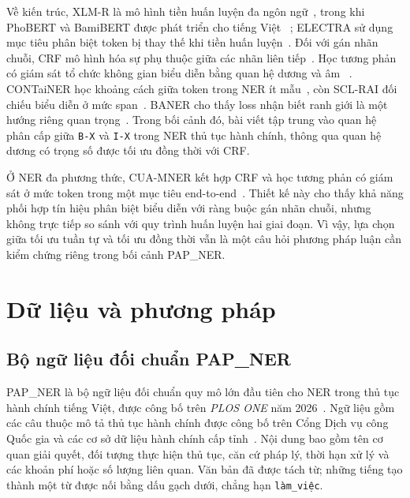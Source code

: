 \documentclass[conference,a4paper]{IEEEtran}
\begin{document}
Về kiến trúc, XLM-R là mô hình tiền huấn luyện đa ngôn ngữ~\cite{conneau2020xlmr},
trong khi PhoBERT và BamiBERT được phát triển cho tiếng Việt
~\cite{nguyen2020phobert,nguyen2026bamibert}; ELECTRA sử dụng mục tiêu phân biệt token bị thay thế khi
tiền huấn luyện~\cite{clark2020electra}. Đối với gán nhãn chuỗi, CRF mô hình hóa sự phụ
thuộc giữa các nhãn liên tiếp~\cite{lafferty2001crf}. Học tương phản có
giám sát tổ chức không gian biểu diễn bằng quan hệ dương và âm
~\cite{khosla2020supcon}. CONTaiNER học khoảng cách giữa token trong NER
ít mẫu~\cite{das2022container}, còn SCL-RAI đối chiếu biểu diễn ở mức
span~\cite{si2022sclrai}. BANER cho thấy loss nhận biết ranh giới là một
hướng riêng quan trọng~\cite{guo2025baner}. Trong bối cảnh đó, bài viết tập trung vào quan hệ phân cấp giữa
\texttt{B-X} và \texttt{I-X} trong NER thủ tục hành chính, thông qua
quan hệ dương có trọng số được tối ưu đồng thời với CRF.

Ở NER đa phương thức, CUA-MNER kết hợp CRF và học tương phản có giám sát
ở mức token trong một mục tiêu end-to-end~\cite{yang2026cuamner}. Thiết kế
này cho thấy khả năng phối hợp tín hiệu phân biệt biểu diễn với ràng buộc
gán nhãn chuỗi, nhưng không trực tiếp so sánh với quy trình huấn luyện hai
giai đoạn. Vì vậy, lựa chọn giữa tối ưu tuần tự và tối ưu đồng thời vẫn là
một câu hỏi phương pháp luận cần kiểm chứng riêng trong bối cảnh PAP\_NER.

\section{Dữ liệu và phương pháp}\label{sec:method}

\subsection{Bộ ngữ liệu đối chuẩn PAP\_NER}\label{subsec:data}

PAP\_NER là bộ ngữ liệu đối chuẩn quy mô lớn đầu tiên cho NER trong thủ
tục hành chính tiếng Việt, được công bố trên \textit{PLOS ONE} năm
2026~\cite{la2026papner}. Ngữ liệu gồm các câu thuộc mô tả thủ tục
hành chính được công bố trên Cổng Dịch vụ công Quốc gia và các cơ sở
dữ liệu hành chính cấp tỉnh~\cite{la2026papner,la2025papnerdata}. Nội dung bao gồm tên cơ quan giải
quyết, đối tượng thực hiện thủ tục, căn cứ pháp lý, thời hạn xử lý và
các khoản phí hoặc số lượng liên quan. Văn bản đã được tách từ; những
tiếng tạo thành một từ được nối bằng dấu gạch dưới, chẳng hạn
\texttt{làm\_việc}.
\end{document}
